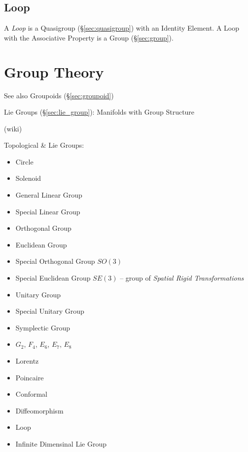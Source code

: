 \subsection{Loop}\label{sec:quasigroup_loop}

A \emph{Loop} is a Quasigroup (\S\ref{sec:quasigroup}) with an
Identity Element. A Loop with the Associative Property is a Group
(\S\ref{sec:group}).



\section{Group Theory}\label{sec:group_theory}

\fist See also Groupoids (\S\ref{sec:groupoid})

\fist Lie Groups (\S\ref{sec:lie_group}): Manifolds with Group Structure

(wiki)

Topological \& Lie Groups:
\begin{itemize}
  \item Circle
  \item Solenoid
  \item General Linear Group
  \item Special Linear Group
  \item Orthogonal Group
  \item Euclidean Group
  \item Special Orthogonal Group $SO(3)$
  \item Special Euclidean Group $SE(3)$ -- group of \emph{Spatial Rigid
    Transformations}
  \item Unitary Group
  \item Special Unitary Group
  \item Symplectic Group
  \item $G_2$, $F_4$, $E_6$, $E_7$, $E_8$
  \item Lorentz
  \item Poincaire
  \item Conformal
  \item Diffeomorphism
  \item Loop
  \item Infinite Dimensinal Lie Group
\end{itemize}

